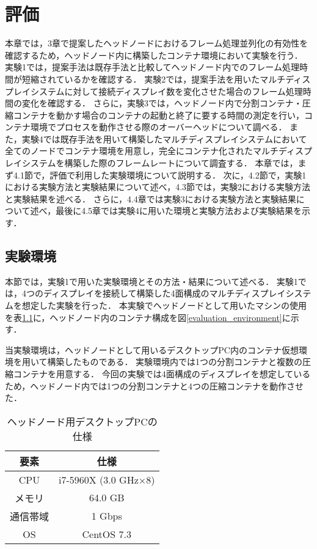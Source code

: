 \chapter{評価}
本章では，3章で提案したヘッドノードにおけるフレーム処理並列化の有効性を確認するため，ヘッドノード内に構築したコンテナ環境において実験を行う．
実験1では，提案手法は既存手法と比較してヘッドノード内でのフレーム処理時間が短縮されているかを確認する．
実験2では，提案手法を用いたマルチディスプレイシステムに対して接続ディスプレイ数を変化させた場合のフレーム処理時間の変化を確認する．
さらに，実験3では，ヘッドノード内で分割コンテナ・圧縮コンテナを動かす場合のコンテナの起動と終了に要する時間の測定を行い，コンテナ環境でプロセスを動作させる際のオーバーヘッドについて調べる．
また，実験4では既存手法を用いて構築したマルチディスプレイシステムにおいて全てのノードでコンテナ環境を用意し，完全にコンテナ化されたマルチディスプレイシステムを構築した際のフレームレートについて調査する．
本章では，まず4.1節で，評価で利用した実験環境について説明する．
次に，4.2節で，実験1における実験方法と実験結果について述べ，4.3節では，実験2における実験方法と実験結果を述べる．
さらに，4.4章では実験3における実験方法と実験結果について述べ，最後に4.5章では実験4に用いた環境と実験方法および実験結果を示す．

\section{実験環境}
本節では，実験1で用いた実験環境とその方法・結果について述べる．
実験1では，4つのディスプレイを接続して構築した4面構成のマルチディスプレイシステムを想定した実験を行った．
本実験でヘッドノードとして用いたマシンの使用を表\ref{headnode}に，ヘッドノード内のコンテナ構成を図\ref{evaluation_environment}に示す．

当実験環境は，ヘッドノードとして用いるデスクトップPC内のコンテナ仮想環境を用いて構築したものである．
実験環境内では1つの分割コンテナと複数の圧縮コンテナを用意する．
今回の実験では4面構成のディスプレイを想定しているため，ヘッドノード内では1つの分割コンテナと4つの圧縮コンテナを動作させた．

\begin{table}[H]
    \caption{ヘッドノード用デスクトップPCの仕様}
    \begin{center}
    \begin{tabular}{cc}
    \hline
    要素 & 仕様 \\\hline\hline
    CPU & i7-5960X (3.0 GHz×8) \\ \hline
    メモリ & 64.0 GB \\ \hline
    通信帯域 & 1 Gbps \\ \hline
    OS & CentOS 7.3 \\ \hline
    \end{tabular}
    \label{headnode}
    \end{center}
\end{table}

